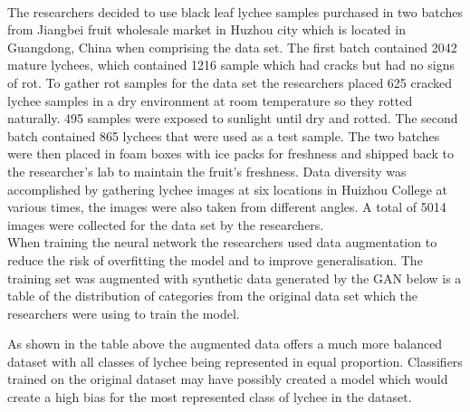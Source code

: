 \\
The researchers decided to use black leaf lychee samples purchased in two batches from Jiangbei fruit wholesale market in Huzhou city which is located in Guangdong, China when comprising the data set.  The first batch contained 2042 mature lychees, which contained 1216 sample which had cracks but had no signs of rot.  To gather rot samples for the data set the researchers placed 625 cracked lychee samples in a dry environment at room temperature so they rotted naturally.  495 samples were exposed to sunlight until dry and rotted.  The second batch contained 865 lychees that were used as a test sample.  The two batches were then placed in foam boxes with ice packs for freshness and shipped back to the researcher's lab to maintain the fruit's freshness.  Data diversity was accomplished by gathering lychee images at six locations in Huizhou College at various times, the images were also taken from different angles.  A total of 5014 images were collected for the data set by the researchers.
\\
When training the neural network the researchers used data augmentation to reduce the risk of overfitting the model and to improve generalisation.  The training set was augmented with synthetic data generated by the GAN below is a table of the distribution of categories from the original data set which the researchers were using to train the model.
\begin{table}[H]
    \centering
    \caption{Comparison of distribution of data augmented vs original(lychee Surface Defect Detection Based on Deep Convolutional
Neural Networks with GAN-Based Data Augmentation)\cite{litReviewLychee}}
    \label{tab:Comparison of distribution of data augmented vs original(lychee Surface Defect Detection Based on Deep Convolutional Neural Networks with GAN-Based Data Augmentation)}
\end{table}
As shown in the table above the augmented data offers a much more balanced dataset with all classes of lychee being represented in equal proportion.  Classifiers trained on the original dataset may have possibly created a model which would create a high bias for the most represented class of lychee in the dataset. 

